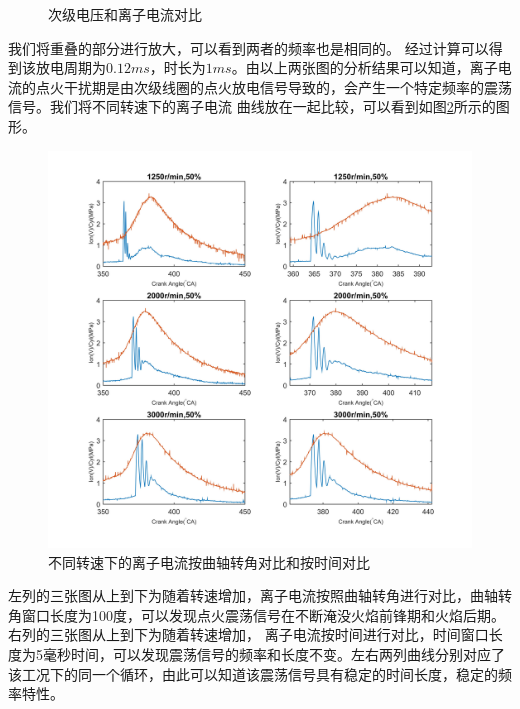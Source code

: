 \begin{figure}[H]
\begin{minipage}{0.5\linewidth}
\end{minipage}
	\caption{次级电压和离子电流对比}
	\label{fig:itf_rs}
\end{figure}
\par 我们将重叠的部分进行放大，可以看到两者的频率也是相同的。
经过计算可以得到该放电周期为$0.12ms$，时长为$1ms$。由以上两张图的分析结果可以知道，离子电流的点火干扰期是由次级线圈的点火放电信号导致的，会产生一个特定频率的震荡信号。我们将不同转速下的离子电流
曲线放在一起比较，可以看到如图\ref{fig:dif_rpm_ion}所示的图形。
\begin{figure}[!ht]
	\centering
	\includegraphics[width=\textwidth]{thesis_figure/ion_chapter/dif_rpm_ion}
	\caption{不同转速下的离子电流按曲轴转角对比和按时间对比}
	\label{fig:dif_rpm_ion}
\end{figure}
\par 左列的三张图从上到下为随着转速增加，离子电流按照曲轴转角进行对比，曲轴转角窗口长度为100度，可以发现点火震荡信号在不断淹没火焰前锋期和火焰后期。右列的三张图从上到下为随着转速增加，
离子电流按时间进行对比，时间窗口长度为5毫秒时间，可以发现震荡信号的频率和长度不变。左右两列曲线分别对应了该工况下的同一个循环，由此可以知道该震荡信号具有稳定的时间长度，稳定的频率特性。
